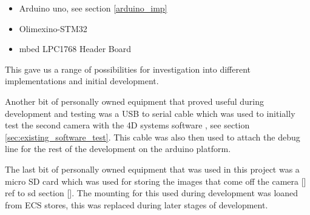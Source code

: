 \begin{itemize}
	\item Arduino uno, see section \ref{arduino_imp} \cite{arduino_serial_library}
	\item Olimexino-STM32
	\item mbed LPC1768 Header Board
\end{itemize}

This gave us a range of possibilities for investigation into different implementations and initial development.

Another bit of personally owned equipment that proved useful during development and testing was a USB to serial cable which was used to initially test the second camera with the 4D systems software , see section \ref{sec:existing_software_test}. This cable was also then used to attach the debug line for the rest of the development on the arduino platform.

The last bit of personally owned equipment that was used in this project was a micro SD card which was used for storing the images that come off the camera [] ref to sd section []. The mounting for this used during development was loaned from ECS stores, this was replaced during later stages of development.